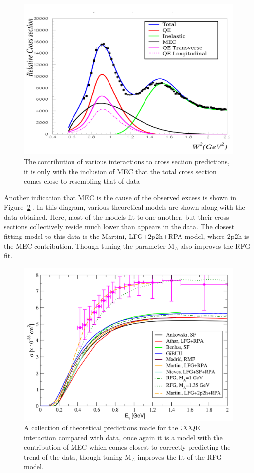     \begin{figure}[h!]
        \centering
        \includegraphics[width=.8\textwidth]{images/dip_region_3.png}
        \caption{The contribution of various interactions to cross section predictions, it is only with the inclusion of MEC that the total cross section comes close to resembling that of data}
        \label{fig:dipReg}
    \end{figure}

    Another indication that MEC is the cause of the observed excess is shown in Figure~\ref{fig:CCQEXsec} \cite{xsecModels}. In this diagram, various theoretical models are shown along with the data obtained. Here, most of the models fit to one another, but their cross sections collectively reside much lower than appears in the data. The closest fitting model to this data is the Martini, LFG+2p2h+RPA model, where 2p2h is the MEC contribution. Though tuning the parameter M\(_{A}\) also improves the RFG fit.  

    \begin{figure}[h!]
        \centering
        \includegraphics[width=.8\textwidth]{images/CCQE_xsec_2.png}
        \caption{A collection of theoretical predictions made for the CCQE interaction compared with data, once again it is a model with the contribution of MEC which comes closest to correctly predicting the trend of the data, though tuning M\(_{A}\) improves the fit of the RFG model.}
        \label{fig:CCQEXsec}
    \end{figure}

